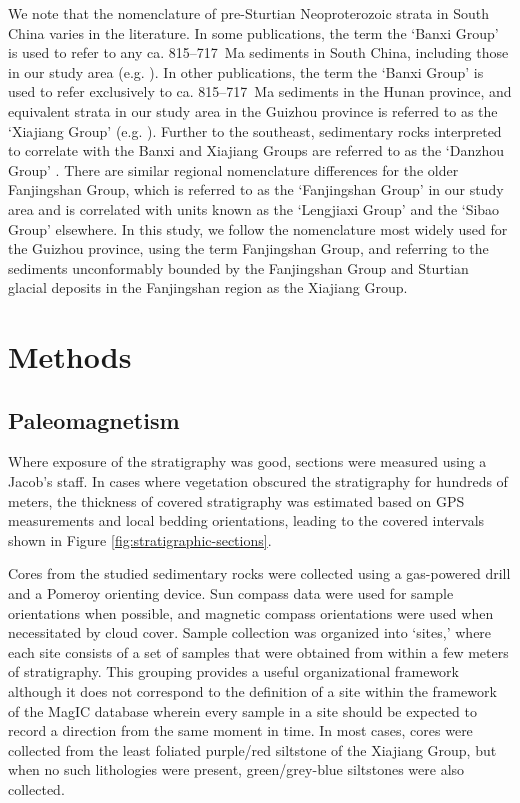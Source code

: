 We note that the nomenclature of pre-Sturtian Neoproterozoic strata in South China varies in the literature. In some publications, the term the `Banxi Group' is used to refer to any ca. 815--717~Ma sediments in South China, including those in our study area (e.g. \citealp{Zhao2011a, Zhang2019c}). In other publications, the term the `Banxi Group' is used to refer exclusively to ca. 815--717~Ma sediments in the Hunan province, and equivalent strata in our study area in the Guizhou province is referred to as the `Xiajiang Group' (e.g. \citealp{BGMRGZ1984a, Wang2014a, Xiong2014a, Geng2015a, Li2016b, Wang2016c, Yan2019a}). Further to the southeast, sedimentary rocks interpreted to correlate with the Banxi and Xiajiang Groups are referred to as the `Danzhou Group' \citep{Yan2019a}. There are similar regional nomenclature differences for the older Fanjingshan Group, which is referred to as the `Fanjingshan Group' in our study area and is correlated with units known as the `Lengjiaxi Group' and the `Sibao Group' elsewhere. In this study, we follow the nomenclature most widely used for the Guizhou province, using the term Fanjingshan Group, and referring to the sediments unconformably bounded by the Fanjingshan Group and Sturtian glacial deposits in the Fanjingshan region as the Xiajiang Group.

\section{Methods}

\subsection{Paleomagnetism}

Where exposure of the stratigraphy was good, sections were measured using a Jacob’s staff. In cases where vegetation obscured the stratigraphy for hundreds of meters, the thickness of covered stratigraphy was estimated based on GPS measurements and local bedding orientations, leading to the covered intervals shown in Figure \ref{fig:stratigraphic-sections}.

Cores from the studied sedimentary rocks were collected using a gas-powered drill and a Pomeroy orienting device. Sun compass data were used for sample orientations when possible, and magnetic compass orientations were used when necessitated by cloud cover. Sample collection was organized into `sites,' where each site consists of a set of samples that were obtained from within a few meters of stratigraphy. This grouping provides a useful organizational framework although it does not correspond to the definition of a site within the framework of the MagIC database wherein every sample in a site should be expected to record a direction from the same moment in time. In most cases, cores were collected from the least foliated purple/red siltstone of the Xiajiang Group, but when no such lithologies were present, green/grey-blue siltstones were also collected.

